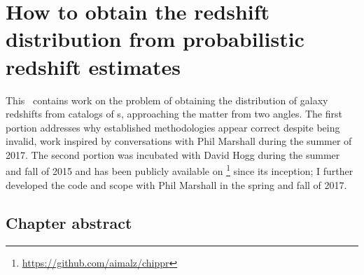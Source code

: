 \renewcommand{\chapid}{chippr}

\newcommand{\Chippr}{\textit{CHIPPR}}
\newcommand{\cosmolike}{\repo{CosmoLike}}
\newcommand{\emcee}{\repo{emcee}}
\newcommand{\boss}{\project{BOSS}}
\newcommand{\mmle}{marginalized maximum likelihood estimate}%
\newcommand{\ndphi}{\bvec{\phi}}
\newcommand{\ntot}{\ensuremath{N_{\mathrm{tot}}}}


\chapter{How to obtain the redshift distribution from probabilistic redshift estimates}

This \paper\ contains work on the problem of obtaining the distribution of galaxy redshifts from catalogs of \pzpdf s, approaching the matter from two angles.
The first portion addresses why established methodologies appear correct despite being invalid, work inspired by conversations with Phil Marshall during the summer of 2017.
The second portion was incubated with David Hogg during the summer and fall of 2015 and has been publicly available on \github\footnote{\url{https://github.com/aimalz/chippr}} since its inception; I further developed the code and scope with Phil Marshall in the spring and fall of 2017.

\section*{Chapter abstract}

